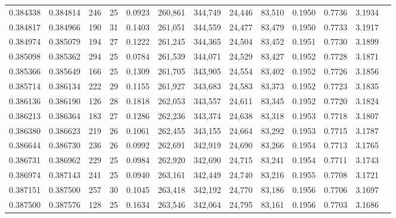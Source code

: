 \begin{tabular}{rrrrrrrrrrrrr}
0.384338 & 0.384814 &    246 &    25 &                                     0.0923 & 260,861 & 344,749 &  24,446 &  83,510 & 0.1950 & 0.7736 & 3.1934 \\
0.384817 & 0.384966 &    190 &    31 &                                     0.1403 & 261,051 & 344,559 &  24,477 &  83,479 & 0.1950 & 0.7733 & 3.1917 \\
0.384974 & 0.385079 &    194 &    27 &                                     0.1222 & 261,245 & 344,365 &  24,504 &  83,452 & 0.1951 & 0.7730 & 3.1899 \\
0.385098 & 0.385362 &    294 &    25 &                                     0.0784 & 261,539 & 344,071 &  24,529 &  83,427 & 0.1952 & 0.7728 & 3.1871 \\
0.385366 & 0.385649 &    166 &    25 &                                     0.1309 & 261,705 & 343,905 &  24,554 &  83,402 & 0.1952 & 0.7726 & 3.1856 \\
0.385714 & 0.386134 &    222 &    29 &                                     0.1155 & 261,927 & 343,683 &  24,583 &  83,373 & 0.1952 & 0.7723 & 3.1835 \\
0.386136 & 0.386190 &    126 &    28 &                                     0.1818 & 262,053 & 343,557 &  24,611 &  83,345 & 0.1952 & 0.7720 & 3.1824 \\
0.386213 & 0.386364 &    183 &    27 &                                     0.1286 & 262,236 & 343,374 &  24,638 &  83,318 & 0.1953 & 0.7718 & 3.1807 \\
0.386380 & 0.386623 &    219 &    26 &                                     0.1061 & 262,455 & 343,155 &  24,664 &  83,292 & 0.1953 & 0.7715 & 3.1787 \\
0.386644 & 0.386730 &    236 &    26 &                                     0.0992 & 262,691 & 342,919 &  24,690 &  83,266 & 0.1954 & 0.7713 & 3.1765 \\
0.386731 & 0.386962 &    229 &    25 &                                     0.0984 & 262,920 & 342,690 &  24,715 &  83,241 & 0.1954 & 0.7711 & 3.1743 \\
0.386974 & 0.387143 &    241 &    25 &                                     0.0940 & 263,161 & 342,449 &  24,740 &  83,216 & 0.1955 & 0.7708 & 3.1721 \\
0.387151 & 0.387500 &    257 &    30 &                                     0.1045 & 263,418 & 342,192 &  24,770 &  83,186 & 0.1956 & 0.7706 & 3.1697 \\
0.387500 & 0.387576 &    128 &    25 &                                     0.1634 & 263,546 & 342,064 &  24,795 &  83,161 & 0.1956 & 0.7703 & 3.1686 \\

\end{tabular}
